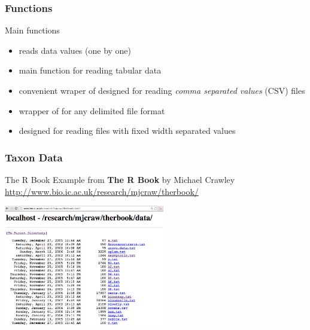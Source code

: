 \documentclass{beamer}\usepackage[]{graphicx}\usepackage[]{color}
\begin{document}

\begin{frame}[fragile]
\frametitle{Functions}

\begin{block}{Main functions}
\begin{itemize}
 \item {} reads data values (one by one)
 \item {} main function for reading tabular data
 \item {} convenient wraper of  designed for reading \textit{comma separated values} (CSV) files
 \item {} wrapper of  for any delimited file format
 \item {} designed for reading files with fixed width 
 separated values
\end{itemize}
\end{block}

\end{frame}


\begin{frame}[fragile]
\frametitle{Taxon Data}

\begin{block}{The R Book}
Example from \textbf{The R Book} by Michael Crawley \\
{\scriptsize \url{http://www.bio.ic.ac.uk/research/mjcraw/therbook/}}
\end{block}

\begin{center}
\includegraphics[width=7cm]{images/rbook_files.png}
\end{center}

\end{frame}

\end{document}
